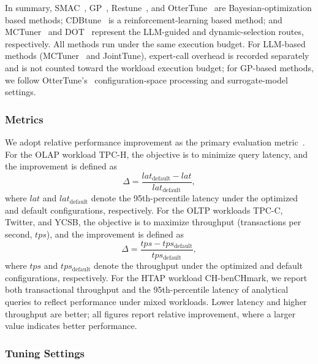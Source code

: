 \documentclass[runningheads]{llncs}
\begin{document}
In summary, SMAC~\cite{smac}, GP~\cite{ituned}, Restune~\cite{restune},
and OtterTune~\cite{ottertune} are Bayesian-optimization based methods;
CDBtune~\cite{cdbtune} is a reinforcement-learning based method; and
MCTuner~\cite{mctuner} and DOT~\cite{dot} represent the LLM-guided and
dynamic-selection routes, respectively. All methods run under the same
execution budget. For LLM-based methods (MCTuner~\cite{mctuner} and
JointTune), expert-call overhead is recorded separately and is not
counted toward the workload execution budget; for GP-based methods, we
follow OtterTune's~\cite{ottertune} configuration-space processing and
surrogate-model settings.

\subsubsection{Metrics}\label{sec:metrics}

We adopt relative performance improvement as the primary evaluation
metric~\cite{e2etune}. For the OLAP workload TPC-H, the objective is to
minimize query latency, and the improvement is defined as
\begin{equation}
  \Delta = \frac{lat_{\mathrm{default}} - lat}{lat_{\mathrm{default}}},
  \label{eq:delta-latency}
\end{equation}
where $lat$ and $lat_{\mathrm{default}}$ denote the 95th-percentile
latency under the optimized and default configurations, respectively.
For the OLTP workloads TPC-C, Twitter, and YCSB, the objective is to
maximize throughput (transactions per second, $tps$), and the
improvement is defined as
\begin{equation}
  \Delta = \frac{tps - tps_{\mathrm{default}}}{tps_{\mathrm{default}}},
  \label{eq:delta-throughput}
\end{equation}
where $tps$ and $tps_{\mathrm{default}}$ denote the throughput under the
optimized and default configurations, respectively. For the HTAP
workload CH-benCHmark, we report both transactional throughput and the
95th-percentile latency of analytical queries to reflect performance
under mixed workloads. Lower latency and higher throughput are better;
all figures report relative improvement, where a larger value indicates
better performance.

\subsubsection{Tuning Settings}\label{sec:tuning-settings}
\end{document}
